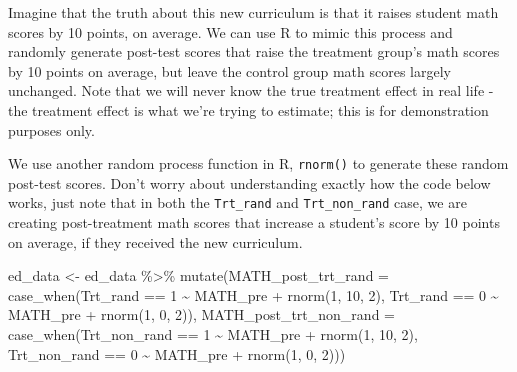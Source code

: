 \documentclass[
  letterpaper,
  DIV=11,
  numbers=noendperiod]{scrreprt}
\newenvironment{Shaded}{\begin{snugshade}}{\end{snugshade}}
\newcommand{\AttributeTok}[1]{\textcolor[rgb]{0.40,0.45,0.13}{#1}}
\newcommand{\DecValTok}[1]{\textcolor[rgb]{0.68,0.00,0.00}{#1}}
\newcommand{\FunctionTok}[1]{\textcolor[rgb]{0.28,0.35,0.67}{#1}}
\newcommand{\NormalTok}[1]{\textcolor[rgb]{0.00,0.23,0.31}{#1}}
\newcommand{\OtherTok}[1]{\textcolor[rgb]{0.00,0.23,0.31}{#1}}
\newcommand{\SpecialCharTok}[1]{\textcolor[rgb]{0.37,0.37,0.37}{#1}}
\theoremstyle{definition}
\theoremstyle{remark}
\begin{document}
Imagine that the truth about this new curriculum is that it raises
student math scores by 10 points, on average. We can use R to mimic this
process and randomly generate post-test scores that raise the treatment
group's math scores by 10 points on average, but leave the control group
math scores largely unchanged. Note that we will never know the true
treatment effect in real life - the treatment effect is what we're
trying to estimate; this is for demonstration purposes only.

We use another random process function in R, \texttt{rnorm()} to
generate these random post-test scores. Don't worry about understanding
exactly how the code below works, just note that in both the
\texttt{Trt\_rand} and \texttt{Trt\_non\_rand} case, we are creating
post-treatment math scores that increase a student's score by 10 points
on average, if they received the new curriculum.

\begin{Shaded}
\begin{Highlighting}[]
\NormalTok{ed\_data }\OtherTok{\textless{}{-}}\NormalTok{ ed\_data }\SpecialCharTok{\%\textgreater{}\%} 
  \FunctionTok{mutate}\NormalTok{(}\AttributeTok{MATH\_post\_trt\_rand =} 
           \FunctionTok{case\_when}\NormalTok{(Trt\_rand }\SpecialCharTok{==} \DecValTok{1} \SpecialCharTok{\textasciitilde{}}\NormalTok{ MATH\_pre }\SpecialCharTok{+} \FunctionTok{rnorm}\NormalTok{(}\DecValTok{1}\NormalTok{, }\DecValTok{10}\NormalTok{, }\DecValTok{2}\NormalTok{), }
\NormalTok{                     Trt\_rand }\SpecialCharTok{==} \DecValTok{0} \SpecialCharTok{\textasciitilde{}}\NormalTok{ MATH\_pre }\SpecialCharTok{+} \FunctionTok{rnorm}\NormalTok{(}\DecValTok{1}\NormalTok{, }\DecValTok{0}\NormalTok{, }\DecValTok{2}\NormalTok{)),}
         \AttributeTok{MATH\_post\_trt\_non\_rand =} 
           \FunctionTok{case\_when}\NormalTok{(Trt\_non\_rand }\SpecialCharTok{==} \DecValTok{1} \SpecialCharTok{\textasciitilde{}}\NormalTok{ MATH\_pre }\SpecialCharTok{+} \FunctionTok{rnorm}\NormalTok{(}\DecValTok{1}\NormalTok{, }\DecValTok{10}\NormalTok{, }\DecValTok{2}\NormalTok{), }
\NormalTok{                     Trt\_non\_rand }\SpecialCharTok{==} \DecValTok{0} \SpecialCharTok{\textasciitilde{}}\NormalTok{ MATH\_pre }\SpecialCharTok{+} \FunctionTok{rnorm}\NormalTok{(}\DecValTok{1}\NormalTok{, }\DecValTok{0}\NormalTok{, }\DecValTok{2}\NormalTok{)))}
\end{Highlighting}
\end{Shaded}
\end{document}
